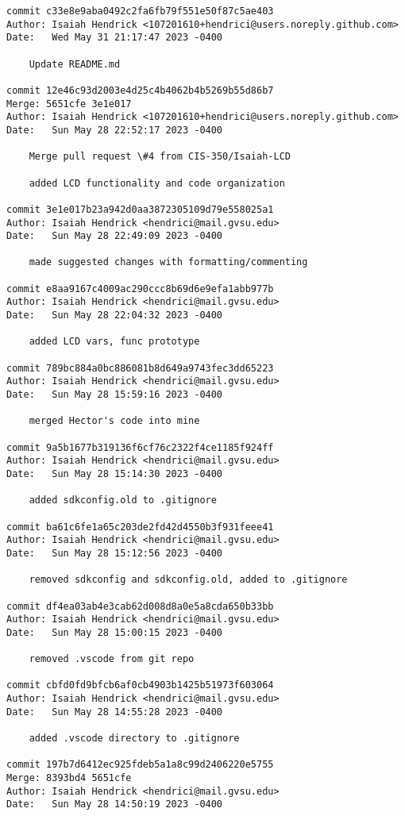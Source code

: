 \begin{verbatim}
commit c33e8e9aba0492c2fa6fb79f551e50f87c5ae403
Author: Isaiah Hendrick <107201610+hendrici@users.noreply.github.com>
Date:   Wed May 31 21:17:47 2023 -0400

    Update README.md

commit 12e46c93d2003e4d25c4b4062b4b5269b55d86b7
Merge: 5651cfe 3e1e017
Author: Isaiah Hendrick <107201610+hendrici@users.noreply.github.com>
Date:   Sun May 28 22:52:17 2023 -0400

    Merge pull request \#4 from CIS-350/Isaiah-LCD
    
    added LCD functionality and code organization

commit 3e1e017b23a942d0aa3872305109d79e558025a1
Author: Isaiah Hendrick <hendrici@mail.gvsu.edu>
Date:   Sun May 28 22:49:09 2023 -0400

    made suggested changes with formatting/commenting

commit e8aa9167c4009ac290ccc8b69d6e9efa1abb977b
Author: Isaiah Hendrick <hendrici@mail.gvsu.edu>
Date:   Sun May 28 22:04:32 2023 -0400

    added LCD vars, func prototype

commit 789bc884a0bc886081b8d649a9743fec3dd65223
Author: Isaiah Hendrick <hendrici@mail.gvsu.edu>
Date:   Sun May 28 15:59:16 2023 -0400

    merged Hector's code into mine

commit 9a5b1677b319136f6cf76c2322f4ce1185f924ff
Author: Isaiah Hendrick <hendrici@mail.gvsu.edu>
Date:   Sun May 28 15:14:30 2023 -0400

    added sdkconfig.old to .gitignore

commit ba61c6fe1a65c203de2fd42d4550b3f931feee41
Author: Isaiah Hendrick <hendrici@mail.gvsu.edu>
Date:   Sun May 28 15:12:56 2023 -0400

    removed sdkconfig and sdkconfig.old, added to .gitignore

commit df4ea03ab4e3cab62d008d8a0e5a8cda650b33bb
Author: Isaiah Hendrick <hendrici@mail.gvsu.edu>
Date:   Sun May 28 15:00:15 2023 -0400

    removed .vscode from git repo

commit cbfd0fd9bfcb6af0cb4903b1425b51973f603064
Author: Isaiah Hendrick <hendrici@mail.gvsu.edu>
Date:   Sun May 28 14:55:28 2023 -0400

    added .vscode directory to .gitignore

commit 197b7d6412ec925fdeb5a1a8c99d2406220e5755
Merge: 8393bd4 5651cfe
Author: Isaiah Hendrick <hendrici@mail.gvsu.edu>
Date:   Sun May 28 14:50:19 2023 -0400


\end{verbatim}
